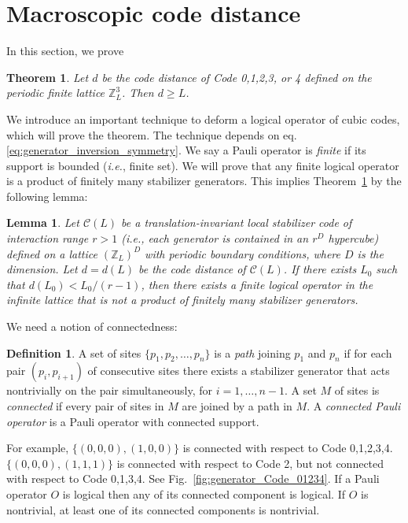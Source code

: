 \documentclass[letterpaper,10pt,pra,aps,showpacs,twocolumn]{revtex4-1}
\newtheorem{lem}{Lemma}
\newtheorem{theorem}{Theorem}
\theoremstyle{definition} \newtheorem{defn}{Definition}
\theoremstyle{definition} \newtheorem{remark}{Remark}
\newcommand{\ie}{\emph{i.e.}}
\begin{document}
\section{Macroscopic code distance}
\label{section:macroscopic_code_distance}

In this section, we prove
\begin{theorem}
Let $d$ be the code distance of Code 0,1,2,3, or 4 defined on the periodic finite lattice $\mathbb{Z}_L^3$. Then $ d \geq L $.
\label{thm:macroscopic_code_distance}
\end{theorem}
\noindent
We introduce an important technique to deform a logical operator of cubic codes, which will prove the theorem. The technique depends on eq.\eqref{eq:generator_inversion_symmetry}. We say a Pauli operator is \emph{finite} if its support is bounded (\ie, finite set). We will prove that any finite logical operator is a product of finitely many stabilizer generators. This implies Theorem~\ref{thm:macroscopic_code_distance} by the following lemma:
 
\begin{lem}
Let $\mathcal{C}(L)$ be a translation-invariant local stabilizer code of interaction range $r > 1$ (\ie, each generator is contained in an $r^D$ hypercube) defined on a lattice $(\mathbb{Z}_L)^D$ with periodic boundary conditions, where $D$ is the dimension. Let $d=d(L)$ be the code distance of $\mathcal{C}(L)$. If there exists $L_0$ such that $d(L_0) < L_0 / (r-1)$, then there exists a finite logical operator in the infinite lattice that is not a product of finitely many stabilizer generators.
\label{lem:trivial_finite_lop_vs_d}
\end{lem}

We need a notion of connectedness:
\begin{defn}
A set of sites $ \{ p_1, p_2,\ldots, p_n \} $ is a \emph{path} joining $p_1$ and $p_n$ if for each pair $(p_i, p_{i+1})$ of consecutive sites there exists a stabilizer generator that acts nontrivially on the pair simultaneously, for $i=1,\ldots, n-1$. A set $M$ of sites is \emph{connected} if every pair of sites in $M$ are joined by a path in $M$. A \emph{connected Pauli operator} is a Pauli operator with connected support.
\end{defn}

\noindent
For example, $\{ (0,0,0), (1,0,0) \}$ is connected with respect to Code 0,1,2,3,4. $\{(0,0,0),(1,1,1)\}$ is connected with respect to Code 2, but not connected with respect to Code 0,1,3,4. See Fig.~\ref{fig:generator_Code_01234}. If a Pauli operator $O$ is logical then any of its connected component is logical. If $O$ is nontrivial, at least one of its connected components is nontrivial.
\end{document}

